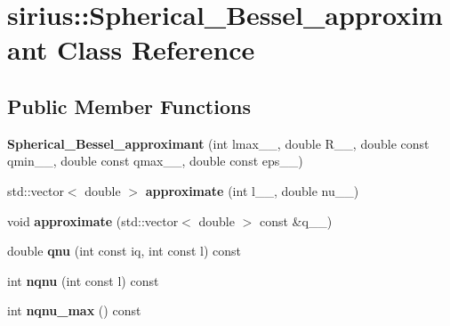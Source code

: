 \hypertarget{classsirius_1_1_spherical___bessel__approximant}{}\section{sirius\+:\+:Spherical\+\_\+\+Bessel\+\_\+approximant Class Reference}
\label{classsirius_1_1_spherical___bessel__approximant}
\subsection*{Public Member Functions}
\begin{DoxyCompactItemize}
\item 
\hypertarget{classsirius_1_1_spherical___bessel__approximant_a9792860090f2172ae04da940dee0414c}{}{\bfseries Spherical\+\_\+\+Bessel\+\_\+approximant} (int lmax\+\_\+\+\_\+, double R\+\_\+\+\_\+, double const qmin\+\_\+\+\_\+, double const qmax\+\_\+\+\_\+, double const eps\+\_\+\+\_\+)\label{classsirius_1_1_spherical___bessel__approximant_a9792860090f2172ae04da940dee0414c}

\item 
\hypertarget{classsirius_1_1_spherical___bessel__approximant_a500d2c1b159bd7797d1ed43036d4c7a3}{}std\+::vector$<$ double $>$ {\bfseries approximate} (int l\+\_\+\+\_\+, double nu\+\_\+\+\_\+)\label{classsirius_1_1_spherical___bessel__approximant_a500d2c1b159bd7797d1ed43036d4c7a3}

\item 
\hypertarget{classsirius_1_1_spherical___bessel__approximant_a2854129efd67b67d63a995b0598a76ae}{}void {\bfseries approximate} (std\+::vector$<$ double $>$ const \&q\+\_\+\+\_\+)\label{classsirius_1_1_spherical___bessel__approximant_a2854129efd67b67d63a995b0598a76ae}

\item 
\hypertarget{classsirius_1_1_spherical___bessel__approximant_af87c9088c329531e91443e8c1b0798a1}{}double {\bfseries qnu} (int const iq, int const l) const \label{classsirius_1_1_spherical___bessel__approximant_af87c9088c329531e91443e8c1b0798a1}

\item 
\hypertarget{classsirius_1_1_spherical___bessel__approximant_acdda2e83c62603da6a4bbad9e78c5501}{}int {\bfseries nqnu} (int const l) const \label{classsirius_1_1_spherical___bessel__approximant_acdda2e83c62603da6a4bbad9e78c5501}

\item 
\hypertarget{classsirius_1_1_spherical___bessel__approximant_a7c7607ddda37bd001c8589b7d57c3fa7}{}int {\bfseries nqnu\+\_\+max} () const \label{classsirius_1_1_spherical___bessel__approximant_a7c7607ddda37bd001c8589b7d57c3fa7}


\end{DoxyCompactItemize}
